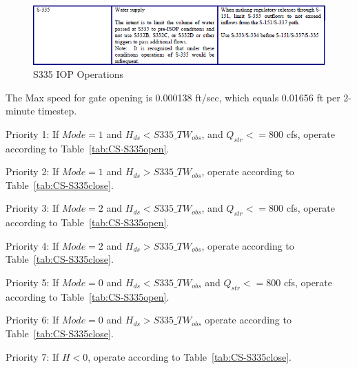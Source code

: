 \begin{figure}[!h]
  \begin{center}
  \includegraphics[width=6.5in]{../figs/S335_IOPops.png}
  \caption{S335 IOP Operations}
  \label{fig:S335iop}
  \end{center}
\end{figure}
%
%


The Max speed for gate opening is 0.000138 ft/sec, which equals 0.01656 ft per 2-minute timestep.

\begin{packed_items}
\item Priority 1: If $Mode=1$ and $H_{ds}<S335\_TW_{obs}$, and $Q_{str}<=800$ cfs, operate according to Table~\ref{tab:CS-S335open}.
\item Priority 2: If $Mode=1$ and $H_{ds}>S335\_TW_{obs}$,  operate according to Table~\ref{tab:CS-S335close}.
\item[]
\item Priority 3: If $Mode=2$ and $H_{ds}<S335\_TW_{obs}$, and $Q_{str}<=800$ cfs, operate according to Table~\ref{tab:CS-S335open}.
\item Priority 4: If $Mode=2$ and $H_{ds}>S335\_TW_{obs}$,  operate according to Table~\ref{tab:CS-S335close}.
\item[]
\item Priority 5: If $Mode=0$ and $H_{ds}<S335\_TW_{obs}$ and $Q_{str}<=800$ cfs,  operate according to Table~\ref{tab:CS-S335open}.
\item Priority 6: If $Mode=0$ and $H_{ds}>S335\_TW_{obs}$ operate according to Table~\ref{tab:CS-S335close}.
\item[]
\item Priority 7: If $H<0$, operate according to Table~\ref{tab:CS-S335close}.
\end{packed_items}

